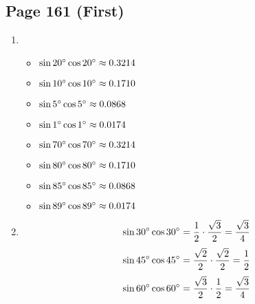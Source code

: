 \documentclass{article}
\newenvironment{solutions}[1]
{\subsection*{#1}
 \begin{enumerate}[leftmargin=1.5em]}
{\end{enumerate}}
\newcommand{\solution}{\item}
\begin{document}
\begin{solutions}{Page 161 (First)}
\solution %
\begin{itemize}
    \item $\sin{20\degree}\cos{20\degree} \approx 0.3214$
    \item $\sin{10\degree}\cos{10\degree} \approx 0.1710$
    \item $\sin{5\degree}\cos{5\degree} \approx 0.0868$
    \item $\sin{1\degree}\cos{1\degree} \approx 0.0174$
    \item $\sin{70\degree}\cos{70\degree} \approx 0.3214$
    \item $\sin{80\degree}\cos{80\degree} \approx 0.1710$
    \item $\sin{85\degree}\cos{85\degree} \approx 0.0868$
    \item $\sin{89\degree}\cos{89\degree} \approx 0.0174$
\end{itemize}

\solution %
\[
\sin{30\degree}\cos{30\degree} = \dfrac{1}{2} \cdot \dfrac{\sqrt{3}}{2} = \dfrac{\sqrt{3}}{4}
\]
\[
\sin{45\degree}\cos{45\degree} = \dfrac{\sqrt{2}}{2} \cdot \dfrac{\sqrt{2}}{2} = \dfrac{1}{2}
\]
\[
\sin{60\degree}\cos{60\degree} = \dfrac{\sqrt{3}}{2} \cdot \dfrac{1}{2}  = \dfrac{\sqrt{3}}{4}
\]
\end{solutions}
\end{document}
